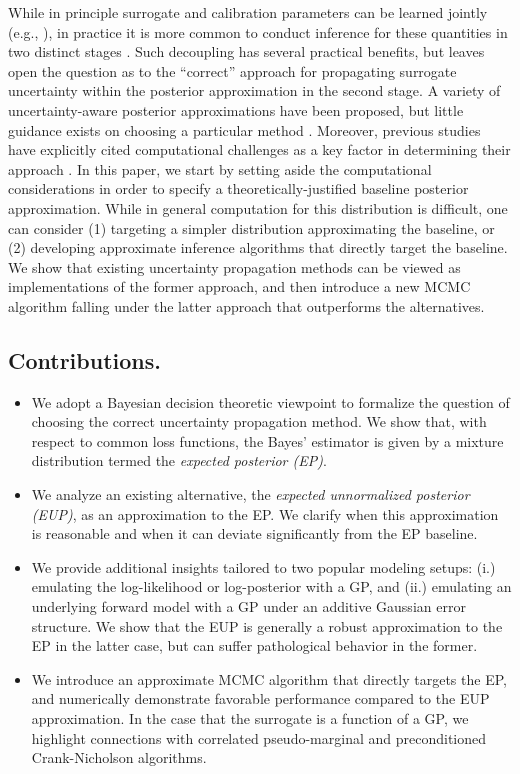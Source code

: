 \documentclass[12pt]{article}
\begin{document}
While in principle surrogate and calibration parameters can be learned 
jointly (e.g., \citet{KOH}), in practice it is more common to conduct inference 
for these quantities in two distinct stages \citep{modularization,PlummerCut}.
Such decoupling has several practical benefits, but leaves open the 
question as to the ``correct'' approach for propagating surrogate uncertainty 
within the posterior approximation in the second stage.
A variety of uncertainty-aware posterior 
approximations have been proposed, but little guidance exists on choosing a particular 
method \citep{reviewPaper,BilionisBayesSurrogates,StuartTeck1,VehtariParallelGP,
BurknerSurrogate,BurknerTwoStep,FerEmulation}. Moreover, previous studies have 
explicitly cited computational challenges as a key factor in determining their 
approach \citep{VehtariParallelGP,StuartTeck2}. In this paper, we start by setting 
aside the computational considerations in order to specify a theoretically-justified 
baseline posterior approximation. While in general computation for this distribution 
is difficult, one can consider (1) targeting a simpler distribution approximating the baseline,
or (2) developing approximate inference algorithms that directly target the baseline.
We show that existing uncertainty propagation methods can be viewed as 
implementations of the former approach, and then introduce a new MCMC algorithm
falling under the latter approach that outperforms the alternatives. 
 
\subsection{Contributions.}
\begin{itemize}
\item We adopt a Bayesian decision theoretic viewpoint to formalize the question of 
choosing the correct uncertainty propagation method. We show that, with respect 
to common loss functions, the Bayes' estimator is given by a mixture distribution 
termed the \textit{expected posterior (EP)}.
\item We analyze an existing alternative, the \textit{expected unnormalized posterior (EUP)},
as an approximation to the EP. We clarify when this approximation is reasonable and 
when it can deviate significantly from the EP baseline.
\item We provide additional insights tailored to two popular modeling setups: 
(i.) emulating the log-likelihood or log-posterior with a GP, and (ii.) emulating an 
underlying forward model with a GP under an additive Gaussian error structure. 
We show that the EUP is generally a robust approximation to the EP in 
the latter case, but can suffer pathological behavior in the former.
\item We introduce an approximate MCMC algorithm that directly 
targets the EP, and numerically demonstrate favorable performance compared 
to the EUP approximation. In the case that the surrogate is a function of a 
GP, we highlight connections with correlated pseudo-marginal and 
preconditioned Crank-Nicholson algorithms. 
\end{itemize}
\end{document}
